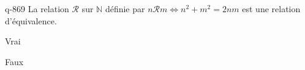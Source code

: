 \begin{truefalse}{q-869}
La relation $\mathcal R$ sur $\mathbb N$ définie par $n\mathcal R m \iff n^2+m^2 = 2nm$ est une relation d'équivalence.
\item* Vrai
\item Faux
\end{truefalse}

